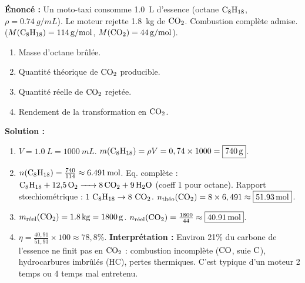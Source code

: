 \documentclass[11pt]{article}
\begin{document}
\begin{exoresolu}
\textbf{Énoncé :} Un moto-taxi consomme \SI{1,0}{L} d'essence (octane $\ce{C8H18}$, $\rho = \SI{0,74}{g/mL}$). Le moteur rejette \SI{1,8}{kg} de $\ce{CO2}$. Combustion complète admise. ($M(\ce{C8H18})=\SI{114}{g/mol}$, $M(\ce{CO2})=\SI{44}{g/mol}$).
\begin{enumerate}
    \item Masse d'octane brûlée.
    \item Quantité théorique de $\ce{CO2}$ producible.
    \item Quantité réelle de $\ce{CO2}$ rejetée.
    \item Rendement de la transformation en $\ce{CO2}$.
\end{enumerate}
\tcblower
\textbf{Solution :}
\begin{enumerate}
    \item $V = \SI{1,0}{L} = \SI{1000}{mL}$. $m(\ce{C8H18}) = \rho V = 0,74 \times 1000 = \boxed{\SI{740}{g}}$.
    \item $n(\ce{C8H18}) = \frac{740}{114} \approx \SI{6,491}{mol}$.
    Eq. complète : $\ce{C8H18 + 12,5 O2 -> 8 CO2 + 9 H2O}$ (coeff 1 pour octane).
    Rapport stœchiométrique : $1~\ce{C8H18} \to 8~\ce{CO2}$.
    $n_{\text{théo}}(\ce{CO2}) = 8 \times 6,491 \approx \boxed{\SI{51,93}{mol}}$.
    \item $m_{\text{réel}}(\ce{CO2}) = \SI{1,8}{kg} = \SI{1800}{g}$.
    $n_{\text{réel}}(\ce{CO2}) = \frac{1800}{44} \approx \boxed{\SI{40,91}{mol}}$.
    \item $\eta = \frac{40,91}{51,93} \times 100 \approx \boxed{78,8\%}$.
    \textbf{Interprétation :} Environ 21\% du carbone de l'essence ne finit pas en $\ce{CO2}$ : combustion incomplète ($\ce{CO}$, suie $\ce{C}$), hydrocarbures imbrûlés (HC), pertes thermiques. C'est typique d'un moteur 2 temps ou 4 temps mal entretenu.
\end{enumerate}
\end{exoresolu}
\end{document}

